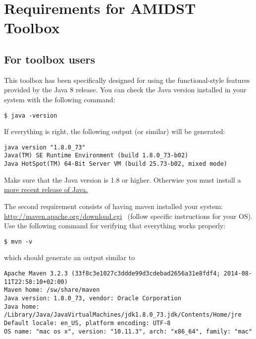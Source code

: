 \documentclass[10pt,a4paper]{article}
\begin{document}
\section{Requirements for AMIDST Toolbox}\label{requirements-amidst-toolbox}

\subsection{For toolbox users }\label{for-toolbox-users}

This toolbox has been specifically designed for using the
functional-style features provided by the Java 8 release. You can check
the Java version installed in your system with the following command:

\begin{verbatim}
$ java -version    
\end{verbatim}

\noindent If everything is right, the following output (or similar) will be
generated:\\

\begin{verbatim}
java version "1.8.0_73"
Java(TM) SE Runtime Environment (build 1.8.0_73-b02)
Java HotSpot(TM) 64-Bit Server VM (build 25.73-b02, mixed mode)   
\end{verbatim}


Make sure that the Java version is 1.8 or higher. Otherwise you must
install a
\href{http://www.oracle.com/technetwork/java/javase/downloads/jdk8-downloads-2133151.html}{more
	recent release of Java.}\newline 

The second requirement consists of having maven installed your system:
\href{http://maven.apache.org/download.cgi\%20\%28follow\%20specific\%20instructions\%20for\%20your\%20OS\%29}{http://maven.apache.org/download.cgi}~
(follow specific instructions for your OS). Use the following command
for verifying that everything works properly:

\begin{verbatim}
$ mvn -v
\end{verbatim}

\noindent which should generate an output similar to\\[2\baselineskip]

\begin{verbatim}
Apache Maven 3.2.3 (33f8c3e1027c3ddde99d3cdebad2656a31e8fdf4; 2014-08-11T22:58:10+02:00)
Maven home: /sw/share/maven
Java version: 1.8.0_73, vendor: Oracle Corporation
Java home: /Library/Java/JavaVirtualMachines/jdk1.8.0_73.jdk/Contents/Home/jre
Default locale: en_US, platform encoding: UTF-8
OS name: "mac os x", version: "10.11.3", arch: "x86_64", family: "mac"    
\end{verbatim}
\end{document}
